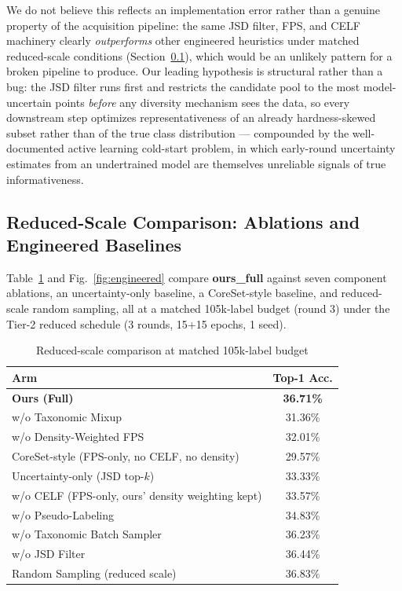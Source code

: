 \documentclass[conference]{IEEEtran}
\begin{document}
We do not believe this reflects an implementation error rather than a genuine property of the acquisition pipeline: the same JSD filter, FPS, and CELF machinery clearly \emph{outperforms} other engineered heuristics under matched reduced-scale conditions (Section~\ref{sec:ablation}), which would be an unlikely pattern for a broken pipeline to produce. Our leading hypothesis is structural rather than a bug: the JSD filter runs first and restricts the candidate pool to the most model-uncertain points \emph{before} any diversity mechanism sees the data, so every downstream step optimizes representativeness of an already hardness-skewed subset rather than of the true class distribution — compounded by the well-documented active learning cold-start problem, in which early-round uncertainty estimates from an undertrained model are themselves unreliable signals of true informativeness.

\subsection{Reduced-Scale Comparison: Ablations and Engineered Baselines}
\label{sec:ablation}
Table~\ref{tab:ablation} and Fig.~\ref{fig:engineered} compare \textbf{ours\_full} against seven component ablations, an uncertainty-only baseline, a CoreSet-style baseline, and reduced-scale random sampling, all at a matched 105k-label budget (round 3) under the Tier-2 reduced schedule (3 rounds, 15+15 epochs, 1 seed).

\begin{table}[t]
\centering
\caption{Reduced-scale comparison at matched 105k-label budget}
\label{tab:ablation}
\small
\begin{tabular}{lc}
\toprule
Arm & Top-1 Acc. \\
\midrule
\textbf{Ours (Full)} & \textbf{36.71\%} \\
\midrule
w/o Taxonomic Mixup & 31.36\% \\
w/o Density-Weighted FPS & 32.01\% \\
CoreSet-style (FPS-only, no CELF, no density) & 29.57\% \\
Uncertainty-only (JSD top-$k$) & 33.33\% \\
w/o CELF (FPS-only, ours' density weighting kept) & 33.57\% \\
w/o Pseudo-Labeling & 34.83\% \\
w/o Taxonomic Batch Sampler & 36.23\% \\
w/o JSD Filter & 36.44\% \\
\midrule
Random Sampling (reduced scale) & 36.83\% \\
\bottomrule
\end{tabular}
\end{table}
\end{document}
